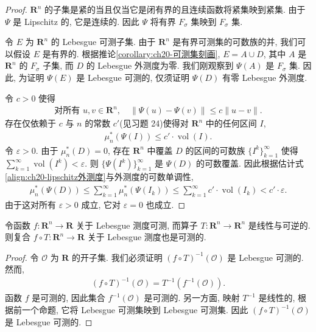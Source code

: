 \documentclass[../../main.tex]{subfiles}
\begin{document}
\begin{proof}
$\mathbf{R}^{n}$ 的子集是紧的当且仅当它是闭有界的且连续函数将紧集映到紧集. 由于 $\Psi$ 是 Lipschitz 的, 它是连续的. 因此 $\Psi$ 将有界 $F_{\sigma}$ 集映到 $F_{\sigma}$ 集.

令 $E$ 为 $\mathbf{R}^{n}$ 的 Lebesgue 可测子集. 由于 $\mathbf{R}^{n}$ 是有界可测集的可数族的并, 我们可以假设 $E$ 是有界的. 根据推论\cref{corollary:ch20-可测集刻画}, $E=A\cup D$, 其中 $A$ 是 $\mathbf{R}^{n}$ 的 $F_{\sigma}$ 子集, 而 $D$ 的 Lebesgue 外测度为零. 我们刚观察到 $\Psi(A)$ 是 $F_{\sigma}$ 集. 因此, 为证明 $\Psi(E)$ 是 Lebesgue 可测的, 仅须证明 $\Psi(D)$ 有零 Lebesgue 外测度.

令 $c>0$ 使得
\begin{align*}
\text{对所有 }u,v\in\mathbf{R}^{n},\quad\|\Psi(u)-\Psi(v)\|\leqslant c\|u-v\|.
\end{align*}
存在仅依赖于 $c$ 与 $n$ 的常数 $c'$(见习题 24)使得对 $\mathbf{R}^{n}$ 中的任何区间 $I$,
\begin{align}\label{align:ch20-lipschitz外测度}
\mu_{n}^{*}(\Psi(I))\leqslant c'\cdot\operatorname{vol}(I).
\end{align}
令 $\varepsilon>0$. 由于 $\mu_{n}^{*}(D)=0$, 存在 $\mathbf{R}^{n}$ 中覆盖 $D$ 的区间的可数族 $\{I^{k}\}_{k=1}^{\infty}$ 使得 $\sum_{k=1}^{\infty}\operatorname{vol}(I^{k})<\varepsilon$. 则 $\{\Psi(I^{k})\}_{k=1}^{\infty}$ 是 $\Psi(D)$ 的可数覆盖. 因此根据估计式\eqref{align:ch20-lipschitz外测度}与外测度的可数单调性,
\begin{align*}
\mu_{n}^{*}(\Psi(D))\leqslant\sum_{k=1}^{\infty}\mu_{n}^{*}(\Psi(I_{k}))\leqslant\sum_{k=1}^{\infty}c'\cdot\operatorname{vol}(I_{k})<c'\cdot\varepsilon.
\end{align*}
由于这对所有 $\varepsilon>0$ 成立, 它对 $\varepsilon=0$ 也成立.
\end{proof}

\begin{corollary}\label{corollary:ch20-复合可测}
令函数 $f:\mathbf{R}^{n}\to\mathbf{R}$ 关于 Lebesgue 测度可测, 而算子 $T:\mathbf{R}^{n}\to\mathbf{R}^{n}$ 是线性与可逆的. 则复合 $f\circ T:\mathbf{R}^{n}\to\mathbf{R}$ 关于 Lebesgue 测度也是可测的.
\end{corollary}

\begin{proof}
令 $\mathcal{O}$ 为 $\mathbf{R}$ 的开子集. 我们必须证明 $(f\circ T)^{-1}(\mathcal{O})$ 是 Lebesgue 可测的. 然而,
\begin{align*}
(f\circ T)^{-1}(\mathcal{O})=T^{-1}(f^{-1}(\mathcal{O})).
\end{align*}
函数 $f$ 是可测的, 因此集合 $f^{-1}(\mathcal{O})$ 是可测的. 另一方面, 映射 $T^{-1}$ 是线性的, 根据前一个命题, 它将 Lebesgue 可测集映到 Lebesgue 可测集. 因此 $(f\circ T)^{-1}(\mathcal{O})$ 是 Lebesgue 可测的.
\end{proof}
\end{document}
